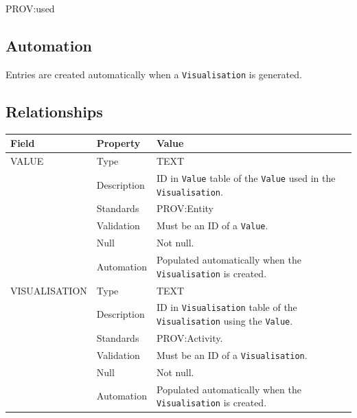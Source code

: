 \documentclass[
]{article}
\newcounter{none} %
\begin{document}
PROV:used

\subsection{Automation}\label{automation-43}

Entries are created automatically when a \texttt{Visualisation} is
generated.

\subsection{Relationships}\label{relationships-34}

{\def\LTcaptype{none} %
\begin{longtable}[]{@{}
  >{\raggedright\arraybackslash}p{}
  >{\raggedright\arraybackslash}p{}
  >{\raggedright\arraybackslash}p{}@{}}
\toprule\noalign{}
\begin{minipage}[b]{\linewidth}\raggedright
Field
\end{minipage} & \begin{minipage}[b]{\linewidth}\raggedright
Property
\end{minipage} & \begin{minipage}[b]{\linewidth}\raggedright
Value
\end{minipage} \\
\midrule\noalign{}
\endhead
\bottomrule\noalign{}
\endlastfoot
VALUE & Type & TEXT \\
& Description & ID in \texttt{Value} table of the \texttt{Value} used in
the \texttt{Visualisation}. \\
& Standards & PROV:Entity \\
& Validation & Must be an ID of a \texttt{Value}. \\
& Null & Not null. \\
& Automation & Populated automatically when the \texttt{Visualisation}
is created. \\
VISUALISATION & Type & TEXT \\
& Description & ID in \texttt{Visualisation} table of the
\texttt{Visualisation} using the \texttt{Value}. \\
& Standards & PROV:Activity. \\
& Validation & Must be an ID of a \texttt{Visualisation}. \\
& Null & Not null. \\
& Automation & Populated automatically when the \texttt{Visualisation}
is created. \\
\end{longtable}
}

\renewcommand\refname{Bibliography}

\end{document}
